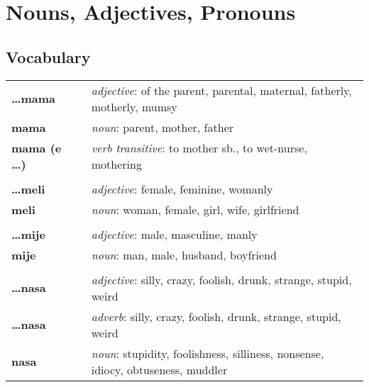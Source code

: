 
\section{Nouns, Adjectives, Pronouns}
\subsection*{Vocabulary}
\begin{supertabular}{p{2,5cm}|ll}
    \textbf{\dots mama}     &  & \textit{adjective}: of the parent, parental, maternal, fatherly, motherly, mumsy        \\
    \textbf{mama}           &  & \textit{noun}: parent, mother, father                                                   \\
    \textbf{mama (e \dots)} &  & \textit{verb transitive}: to mother sb., to wet-nurse, mothering                        \\
                            &  &                                                                                         \\
    \textbf{\dots meli}     &  & \textit{adjective}: female, feminine, womanly                                           \\
    \textbf{meli}           &  & \textit{noun}: woman, female, girl, wife, girlfriend                                    \\
                            &  &                                                                                         \\
    \textbf{\dots mije}     &  & \textit{adjective}: male, masculine, manly                                              \\
    \textbf{mije}           &  & \textit{noun}: man, male, husband, boyfriend                                            \\
                            &  &                                                                                         \\
    \textbf{\dots nasa}     &  & \textit{adjective}: silly, crazy, foolish, drunk, strange, stupid, weird                \\
    \textbf{\dots nasa}     &  & \textit{adverb}: silly, crazy, foolish, drunk, strange, stupid, weird                   \\
    \textbf{nasa}           &  & \textit{noun}: stupidity, foolishness, silliness, nonsense, idiocy, obtuseness, muddler \\

\end{supertabular}
